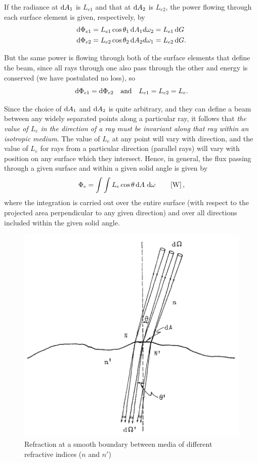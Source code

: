 If the radiance at $\mathop{}\!\mathrm{d} A_1$ is $L_{e1}$ and that at $\mathop{}\!\mathrm{d} A_2$ is $L_{e2}$, the power
flowing
through each surface element is given, respectively, by
\begin{align}
\mathop{}\!\mathrm{d} \Phi_{e1} &= L_{e1} \cos\theta_1 \mathop{}\!\mathrm{d} A_1 d\omega_2 = L_{e1} \mathop{}\!\mathrm{d} G \nonumber\\
\mathop{}\!\mathrm{d} \Phi_{e2} &= L_{e2} \cos\theta_2 \mathop{}\!\mathrm{d} A_2 d\omega_1 = L_{e2} \mathop{}\!\mathrm{d} G.
\end{align}

But the same power is flowing through both of the surface elements that define
the
beam, since all rays through one also pass through the other and energy is
conserved
(we have postulated no loss), so
\begin{equation}
\mathop{}\!\mathrm{d} \Phi_{e1} = \mathop{}\!\mathrm{d} \Phi_{e2}\quad \textrm{and} \quad L_{e1} = L_{e2} = L_e.
\end{equation}

Since the choice of $\mathop{}\!\mathrm{d} A_1$ and $\mathop{}\!\mathrm{d} A_2$ is quite arbitrary, and they can define a
beam between any widely separated points along a particular ray, it follows that
\emph{the value of $L_e$ in the direction of a ray must be invariant along that
ray within an isotropic medium}.
The value of $L_e$ at any point will vary with direction, and the value of $L_e$
for rays from a particular direction (parallel rays) will vary with position on
any surface which they intersect. Hence, in general, the flux passing through a
given surface and within a given solid
angle is given by
\begin{equation}\label{eqn:nicodemus12}
\Phi_e = \int \int L_e \cos\theta \mathop{}\!\mathrm{d} A \, \mathop{}\!\mathrm{d} \omega
\qquad \left[\si{\watt}\right],
\end{equation}
where the integration is carried out over the entire surface (with respect to
the projected area perpendicular to any given direction) and over all directions
included within the given solid angle.

\begin{figure}
\begin{center}
\includegraphics{figures/nicodemus1963-fig3.pdf}	
\end{center}
\caption{Refraction at a smooth boundary between media of
different refractive indices ($n$ and $n'$)}
\label{fig:nicodemus3}
\end{figure}

